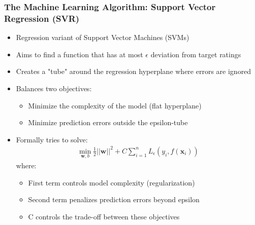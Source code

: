 \documentclass{beamer}
\begin{document}
\begin{frame}
\frametitle{The Machine Learning Algorithm: Support Vector Regression (SVR)}

\begin{itemize}
    \item Regression variant of Support Vector Machines (SVMs)
    \item Aims to find a function that has at most $\epsilon$ deviation from target ratings
    \item Creates a "tube" around the regression hyperplane where errors are ignored
    \item Balances two objectives:
    \begin{itemize}
        \item Minimize the complexity of the model (flat hyperplane)
        \item Minimize prediction errors outside the epsilon-tube
    \end{itemize}
    \item Formally tries to solve:
    \begin{align*}
    \min_{\mathbf{w}, b} \frac{1}{2}||\mathbf{w}||^2 + C \sum_{i=1}^{n} L_{\epsilon}(y_i, f(\mathbf{x}_i))
    \end{align*}
    where:
    \begin{itemize}
        \item First term controls model complexity (regularization)
        \item Second term penalizes prediction errors beyond epsilon
        \item C controls the trade-off between these objectives
    \end{itemize}
\end{itemize}
\end{frame}
\end{document}
